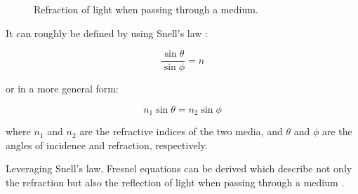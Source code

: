 \begin{figure}[H]
  \centering
  \caption{Refraction of light when passing through a medium.}
  \label{fig:basic-refraction}
\end{figure}

It can roughly be defined by using Snell's law \cite{fowles1989introduction}:

\begin{equation}
  \label{eqn:snells-law}
  \frac{\sin \theta}{\sin \phi} = n
\end{equation}

or in a more general form:

\begin{equation}
  \label{eqn:snells-law-general}
  n_1 \sin \theta = n_2 \sin \phi
\end{equation}

where $n_1$ and $n_2$ are the refractive indices of the two media, and $\theta$ and $\phi$ are the angles of incidence and refraction, respectively.

Leveraging Snell's law, Fresnel equations can be derived which describe not only the refraction but also the reflection of light when passing through a medium \cite{fowles1989introduction}.

